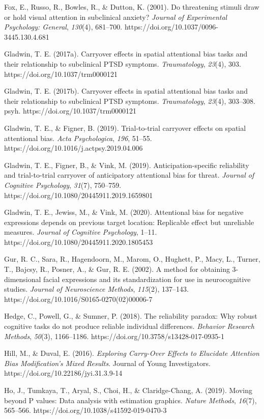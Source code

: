 \documentclass{article}
\begin{document}
Fox, E., Russo, R., Bowles, R., \& Dutton, K. (2001). Do threatening stimuli draw or hold visual attention in subclinical anxiety? \emph{Journal of Experimental Psychology: General}, \emph{130}(4), 681--700. https://doi.org/10.1037/0096-3445.130.4.681

Gladwin, T. E. (2017a). Carryover effects in spatial attentional bias tasks and their relationship to subclinical PTSD symptoms. \emph{Traumatology}, \emph{23}(4), 303. https://doi.org/10.1037/trm0000121

Gladwin, T. E. (2017b). Carryover effects in spatial attentional bias tasks and their relationship to subclinical PTSD symptoms. \emph{Traumatology}, \emph{23}(4), 303--308. psyh. https://doi.org/10.1037/trm0000121

Gladwin, T. E., \& Figner, B. (2019). Trial-to-trial carryover effects on spatial attentional bias. \emph{Acta Psychologica}, \emph{196}, 51--55. https://doi.org/10.1016/j.actpsy.2019.04.006

Gladwin, T. E., Figner, B., \& Vink, M. (2019). Anticipation-specific reliability and trial-to-trial carryover of anticipatory attentional bias for threat. \emph{Journal of Cognitive Psychology}, \emph{31}(7), 750--759. https://doi.org/10.1080/20445911.2019.1659801

Gladwin, T. E., Jewiss, M., \& Vink, M. (2020). Attentional bias for negative expressions depends on previous target location: Replicable effect but unreliable measures. \emph{Journal of Cognitive Psychology}, 1--11. https://doi.org/10.1080/20445911.2020.1805453

Gur, R. C., Sara, R., Hagendoorn, M., Marom, O., Hughett, P., Macy, L., Turner, T., Bajcsy, R., Posner, A., \& Gur, R. E. (2002). A method for obtaining 3-dimensional facial expressions and its standardization for use in neurocognitive studies. \emph{Journal of Neuroscience Methods}, \emph{115}(2), 137--143. https://doi.org/10.1016/S0165-0270(02)00006-7

Hedge, C., Powell, G., \& Sumner, P. (2018). The reliability paradox: Why robust cognitive tasks do not produce reliable individual differences. \emph{Behavior Research Methods}, \emph{50}(3), 1166--1186. https://doi.org/10.3758/s13428-017-0935-1

Hill, M., \& Duval, E. (2016). \emph{Exploring Carry-Over Effects to Elucidate Attention Bias Modification's Mixed Results}. Journal of Young Investigators. https://doi.org/10.22186/jyi.31.3.9-14

Ho, J., Tumkaya, T., Aryal, S., Choi, H., \& Claridge-Chang, A. (2019). Moving beyond P values: Data analysis with estimation graphics. \emph{Nature Methods}, \emph{16}(7), 565--566. https://doi.org/10.1038/s41592-019-0470-3
\end{document}
